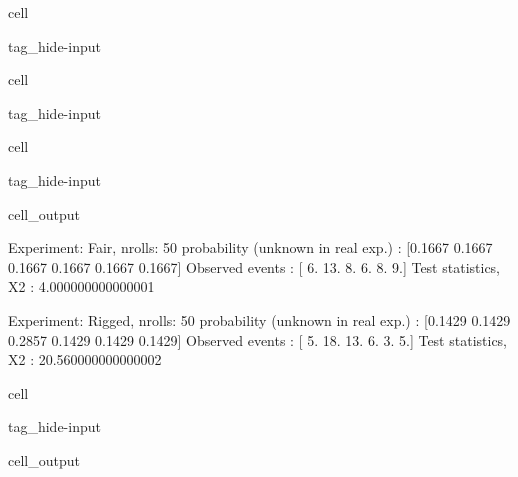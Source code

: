 \documentclass[letterpaper,10pt,italian]{jupyterBook}
\begin{document}
\begin{sphinxuseclass}{cell}
\begin{sphinxuseclass}{tag_hide-input}
\end{sphinxuseclass}
\end{sphinxuseclass}
\begin{sphinxuseclass}{cell}
\begin{sphinxuseclass}{tag_hide-input}
\end{sphinxuseclass}
\end{sphinxuseclass}
\begin{sphinxuseclass}{cell}
\begin{sphinxuseclass}{tag_hide-input}\begin{sphinxVerbatimOutput}

\begin{sphinxuseclass}{cell_output}
\begin{sphinxVerbatim}[commandchars=\\\{\}]
Experiment: Fair, nrolls: 50
\PYGZhy{} probability (unknown in real exp.) : [0.1667 0.1667 0.1667 0.1667 0.1667 0.1667]
\PYGZhy{} Observed events                    : [ 6. 13.  8.  6.  8.  9.]
\PYGZhy{} Test statistics, X2                : 4.000000000000001

Experiment: Rigged, nrolls: 50
\PYGZhy{} probability (unknown in real exp.) : [0.1429 0.1429 0.2857 0.1429 0.1429 0.1429]
\PYGZhy{} Observed events                    : [ 5. 18. 13.  6.  3.  5.]
\PYGZhy{} Test statistics, X2                : 20.560000000000002
\end{sphinxVerbatim}

\end{sphinxuseclass}\end{sphinxVerbatimOutput}

\end{sphinxuseclass}
\end{sphinxuseclass}
\begin{sphinxuseclass}{cell}
\begin{sphinxuseclass}{tag_hide-input}\begin{sphinxVerbatimOutput}

\begin{sphinxuseclass}{cell_output}
\noindent{}

\end{sphinxuseclass}\end{sphinxVerbatimOutput}

\end{sphinxuseclass}
\end{sphinxuseclass}
\end{document}
